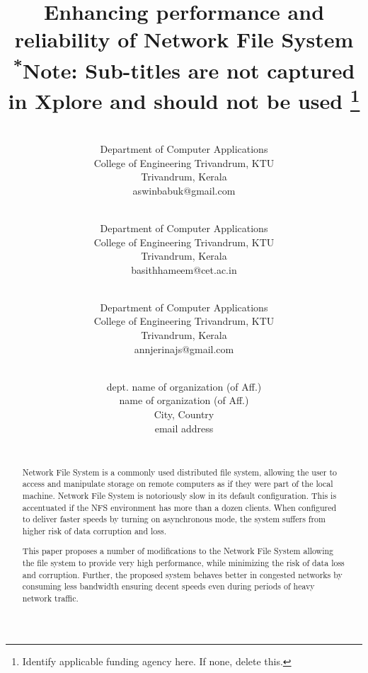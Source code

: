 \documentclass[conference]{IEEEtran}
\begin{document}
\title{Enhancing performance and reliability of Network File System\\
{\footnotesize \textsuperscript{*}Note: Sub-titles are not captured in Xplore and
should not be used}
\thanks{Identify applicable funding agency here. If none, delete this.}
}

\author{
\\
Department of Computer Applications \\
College of Engineering Trivandrum, KTU\\
Trivandrum, Kerala \\
aswinbabuk@gmail.com\\
\and {}\\
Department of Computer Applications \\
College of Engineering Trivandrum, KTU\\
Trivandrum, Kerala \\
basithhameem@cet.ac.in\\
\and {}\\
Department of Computer Applications \\
College of Engineering Trivandrum, KTU\\
Trivandrum, Kerala  \\
annjerinajs@gmail.com\\
\and {}\\
dept. name of organization (of Aff.) \\
name of organization (of Aff.)\\
City, Country \\
email address\\
\\
}
\maketitle

\begin{abstract}
Network File System is a commonly used distributed file system, allowing the user to access and manipulate storage on remote computers as if they were part of the local machine. Network File System is notoriously slow in its default configuration. This is accentuated if the NFS environment has more than a dozen clients. When configured to deliver faster speeds by turning on asynchronous mode, the system suffers from higher risk of data corruption and loss.

This paper proposes a number of modifications to the Network File System allowing the file system to provide very high performance, while minimizing the risk of data loss and corruption. Further, the proposed system behaves better in congested networks by consuming less bandwidth ensuring decent speeds even during periods of heavy network traffic.
\end{abstract}
\end{document}
